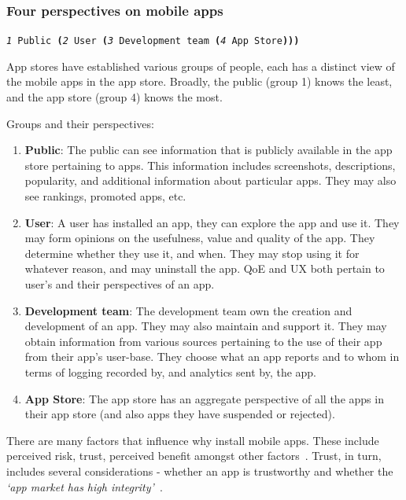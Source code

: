 \subsubsection{Four perspectives on mobile apps}
\large{\texttt{\emph{1} Public \textbf{(}\emph{2} User \textbf{(}\emph{3} Development team \textbf{(}\emph{4} App Store\textbf{)))}}}

App stores have established various groups of people, each has a distinct view of the mobile apps in the app store. Broadly, the public (group 1) knows the least, and the app store (group 4) knows the most.

Groups and their perspectives:
\begin{enumerate}
    \item \textbf{Public}: The public can see information that is publicly available in the app store pertaining to apps. This information includes screenshots, descriptions, popularity, and additional information about particular apps. They may also see rankings, promoted apps, etc.
    \item \textbf{User}: A user has installed an app, they can explore the app and use it. They may form opinions on the usefulness, value and quality of the app. They determine whether they use it, and when. They may stop using it for whatever reason, and may uninstall the app. QoE and UX both pertain to user's and their perspectives of an app.
    \item \textbf{Development team}: The development team own the creation and development of an app. They may also maintain and support it. They may obtain information from various sources pertaining to the use of their app from their app's user-base. They choose what an app reports and to whom in terms of logging recorded by, and analytics sent by, the app.
    \item \textbf{App Store}: The app store has an aggregate perspective of all the apps in their app store (and also apps they have suspended or rejected).
\end{enumerate}

There are many factors that influence why install mobile apps. These include perceived risk, trust, perceived benefit amongst other factors~\cite{harris2016identifying}. Trust, in turn, includes several considerations - whether an app is trustworthy and whether the \emph{`app market has high integrity'}~\cite{harris2016identifying}.

